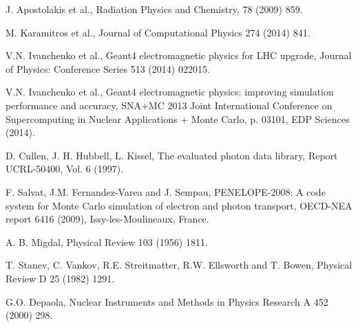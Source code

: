 
J. Apostolakis et al., 
Radiation Physics and Chemistry, 78 (2009) 859.

 M. Karamitros et al., 
                     Journal of Computational Physics 274 (2014) 841. 

 V.N. Ivanchenko et al., Geant4 electromagnetic physics for LHC 
                       upgrade, Journal of Physics: Conference Series 513 (2014) 022015.

 V.N. Ivanchenko et al., Geant4 electromagnetic physics:
                     improving simulation performance and accuracy, SNA+MC 2013 Joint 
                     International Conference on Supercomputing in Nuclear Applications
                     + Monte Carlo, p. 03101, EDP Sciences (2014).

 D. Cullen, J. H. Hubbell, L. Kissel, 
                     The evaluated photon data library, Report UCRL-50400, Vol. 6 (1997).

 F. Salvat, J.M. Fernandez-Varea and J. Sempau, 
                    PENELOPE-2008: A code system for Monte Carlo simulation of electron
                    and photon transport, OECD-NEA report 6416 (2009),
                    Issy-les-Moulineaux, France.

 A. B. Migdal,
                       Physical Review 103 (1956) 1811.

 T. Stanev, C. Vankov, R.E. Streitmatter, R.W. Ellsworth and T. Bowen,
                       Physical Review D 25 (1982) 1291.

 G.O. Depaola,
                        Nuclear Instruments and Methods in Physics Research A 452 (2000) 298.

